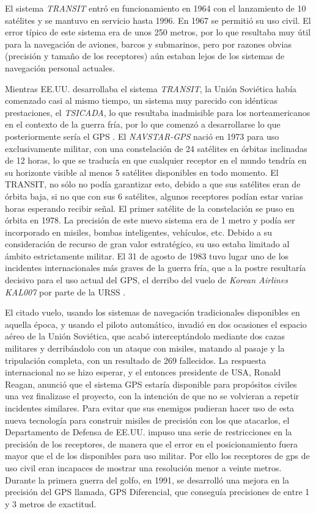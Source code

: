 El sistema \textit{TRANSIT} entró en funcionamiento en 1964 con el lanzamiento de 10 satélites y se mantuvo en servicio
hasta 1996. En 1967 se permitió su uso civil. El error típico de este sistema era de unos 250
metros, por lo que resultaba muy útil para la navegación de aviones, barcos y submarinos, pero
por razones obvias (precisión y tamaño de los receptores) aún estaban lejos de los sistemas de
navegación personal actuales.

Mientras \ac{EE.UU.} desarrollaba el sistema \textit{TRANSIT}, la Unión Soviética había comenzado casi al mismo tiempo, un sistema muy parecido con idénticas prestaciones, el \textit{TSICADA}, lo que resultaba inadmisible para los norteamericanos en el
contexto de la guerra fría, por lo que comenzó a desarrollarse lo que posteriormente sería el
\ac{GPS} \cite{Pala10}.
El \textit{NAVSTAR-GPS} nació en 1973 para uso exclusivamente militar, con una constelación de 24
satélites en órbitas inclinadas de 12 horas, lo que se traducía en que cualquier receptor en el
mundo tendría en su horizonte visible al menos 5 satélites disponibles en todo momento. El
TRANSIT, no sólo no podía garantizar esto, debido a que sus satélites eran de órbita baja, si no
que con sus 6 satélites, algunos receptores podían estar varias horas esperando recibir señal. El primer
satélite de la constelación se puso en órbita en 1978. La precisión de este nuevo sistema era de 1 metro y podía
ser incorporado en misiles, bombas inteligentes, vehículos, etc. Debido a su consideración de
recurso de gran valor estratégico, su uso estaba limitado al ámbito estrictamente militar.
 El 31 de agosto de 1983 tuvo lugar uno de los incidentes internacionales más graves de la
guerra fría, que a la postre resultaría decisivo para el uso actual del \ac{GPS}, el derribo del vuelo de
\textit{Korean Airlines KAL007} por parte de la \ac{URSS} \cite{Kore15}.

El citado vuelo, usando los sistemas de navegación tradicionales disponibles en aquella época, y
usando el piloto automático, invadió en dos ocasiones el espacio aéreo de la Unión Soviética,
que acabó interceptándolo mediante dos cazas militares y derribándolo con un ataque con
misiles, matando al pasaje y la tripulación completa, con un resultado de 269 fallecidos.
La respuesta internacional no se hizo esperar, y el entonces presidente de \ac{USA}, Ronald Reagan,
anunció que el sistema \ac{GPS} estaría disponible para propósitos civiles una vez finalizase el
proyecto, con la intención de que no se volvieran a repetir incidentes similares.
 Para evitar que sus enemigos pudieran hacer uso de esta nueva tecnología para construir
misiles de precisión con los que atacarlos, el Departamento de Defensa de \ac{EE.UU.} impuso una
serie de restricciones en la precisión de los receptores, de manera que el error en el
posicionamiento fuera mayor que el de los disponibles para uso militar. Por ello los receptores de gps de uso
civil eran incapaces de mostrar una resolución menor a veinte metros.
Durante la primera guerra del golfo, en 1991, se desarrolló una mejora en la precisión del \ac{GPS}
llamada, \ac{GPS} Diferencial, que conseguía precisiones de entre 1 y 3 metros de exactitud.

